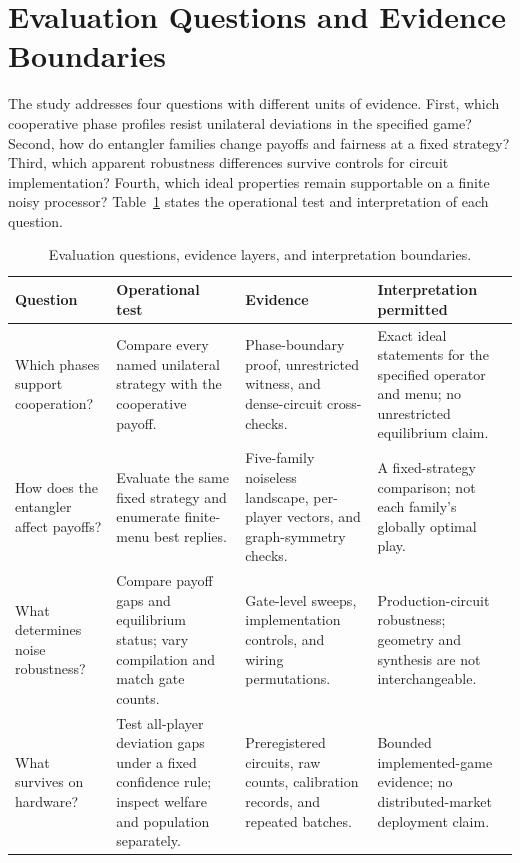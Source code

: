 \section{Evaluation Questions and Evidence Boundaries}\label{sec:evaluation}
The study addresses four questions with different units of evidence.
First, which cooperative phase profiles resist unilateral deviations in
the specified game? Second, how do entangler families change payoffs and
fairness at a fixed strategy? Third, which apparent robustness differences
survive controls for circuit implementation? Fourth, which ideal properties
remain supportable on a finite noisy processor? Table~\ref{tab:evidence-boundaries}
states the operational test and interpretation of each question.

\begin{table}[t]
\centering
\caption{Evaluation questions, evidence layers, and interpretation boundaries.}
\label{tab:evidence-boundaries}
\begin{tabular}{p{}p{}p{}p{}}
\toprule
Question & Operational test & Evidence & Interpretation permitted\\
\midrule
Which phases support cooperation? & Compare every named unilateral strategy
with the cooperative payoff. & Phase-boundary proof, unrestricted witness,
and dense-circuit cross-checks. & Exact ideal statements for the specified
operator and menu; no unrestricted equilibrium claim.\\
How does the entangler affect payoffs? & Evaluate the same fixed strategy
and enumerate finite-menu best replies. & Five-family noiseless landscape,
per-player vectors, and graph-symmetry checks. & A fixed-strategy comparison;
not each family's globally optimal play.\\
What determines noise robustness? & Compare payoff gaps and equilibrium
status; vary compilation and match gate counts. & Gate-level sweeps,
implementation controls, and wiring permutations. & Production-circuit
robustness; geometry and synthesis are not interchangeable.\\
What survives on hardware? & Test all-player deviation gaps under a fixed
confidence rule; inspect welfare and population separately. & Preregistered
circuits, raw counts, calibration records, and repeated batches. & Bounded
implemented-game evidence; no distributed-market deployment claim.\\
\bottomrule
\end{tabular}
\end{table}

